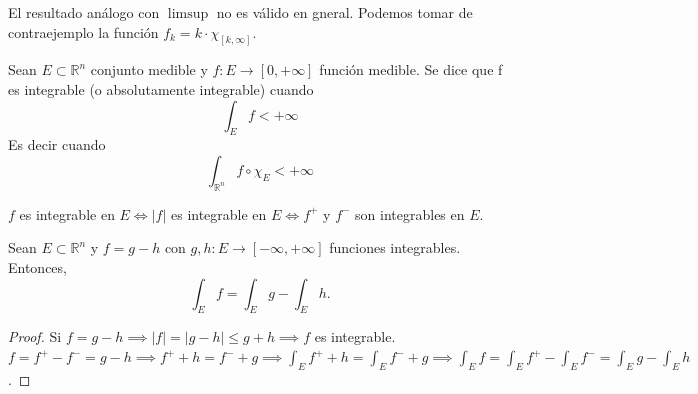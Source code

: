 \begin{observación}
El resultado análogo con $\limsup$ no es válido en gneral. Podemos tomar de contraejemplo la función $f_k = k \cdot \chi_{[k, \infty]}$.
\end{observación}
\begin{definición}
Sean $E \subset \mathbb{R}^n$ conjunto medible y $f: E \to [0, +\infty]$ función medible. Se dice que f es integrable (o absolutamente integrable) cuando $$\int_{E}f < +\infty$$ Es decir cuando $$\int_{\mathbb{R}^n}f \circ \chi_E < +\infty$$
\end{definición}
\begin{observación}
$f$ es integrable en $E \iff |f|$ es integrable en $E \iff f^+ $ y $ f^-$ son integrables en $E$.
\end{observación}
\begin{lema}
    Sean $E \subset \mathbb{R}^n$ y $f = g - h$ con $g, h: E \to [-\infty, +\infty]$ funciones integrables. Entonces, $$ \int_{E}f = \int_{E}g - \int_{E}h.$$
\end{lema}
\begin{proof}
    Si $ f = g - h \implies  |f| = |g - h| \leq g + h \implies f$ es integrable.
    $f = f^+ - f^- = g - h \implies f^+ + h = f^- + g \implies \int_{E}f^+ + h = \int_{E}f^- + g \implies \int_{E}f = \int_{E}f^+ - \int_{E}f^- = \int_{E}g - \int_{E}h$.
\end{proof}
